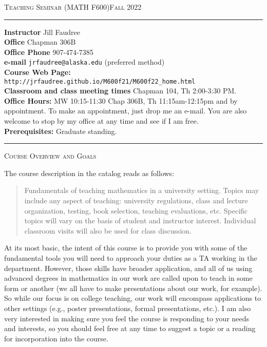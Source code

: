 \documentclass[12pt]{article}
\begin{document}
\normalem
\begin{center}
 \textsc{Teaching Seminar (MATH F600)\hfill Fall 2022}
\end{center}

\rule{\textwidth}{.1pt}

\textbf{Instructor} Jill Faudree\\
\textbf{Office} Chapman 306B\\
\textbf{Office Phone} 907-474-7385\\
\textbf{e-mail} {\tt jrfaudree@alaska.edu} (preferred method)\\
\textbf{Course Web Page:} {\tt http://jrfaudree.github.io/M600f21/M600f22\_home.html}\\
\textbf{Classroom and class meeting times} Chapman 104, Th 2:00-3:30 PM. \\
\textbf{Office Hours:}  MW 10:15-11:30 Chap 306B, Th 11:15am-12:15pm and by appointment. To make an appointment, just drop me an e-mail. You are also welcome to stop by my office at any time and see if I am free.\\
\textbf{Prerequisites:} Graduate standing.

\rule{\textwidth}{.1pt}  

\textsc{Course Overview and Goals} 

The course description in the catalog reads as follows:
\begin{quote}Fundamentals of teaching mathematics in a university setting. Topics may include any aspect of teaching: university regulations, class and lecture organization, testing, book selection, teaching evaluations, etc. Specific topics will vary on the basis of student and instructor interest. Individual classroom visits will also be used for class discussion.\end{quote}
At its most basic, the intent of this course is to provide you with some of the fundamental tools you will need to approach your duties as a TA working in the department. However, those skills have broader application, and all of us using advanced degrees in mathematics in our work are called upon to teach in some form or another (we all have to make presentations about our work, for example). So while our focus is on college teaching, our work will encompass  applications to other settings (e.g., poster presentations, formal presentations, etc.). I am also very interested in making sure you feel the course is responding to your needs and interests, so you should feel free at any time to suggest a topic or a reading for incorporation into the course.
 
\end{document}
